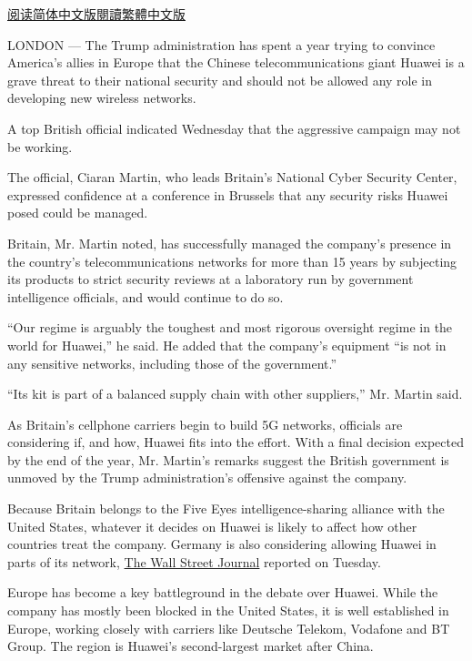 \href{https://cn.nytimes.com/business/20190221/huawei-uk-trump/}{阅读简体中文版}\href{https://cn.nytimes.com/business/20190221/huawei-uk-trump/zh-hant/}{閱讀繁體中文版}

LONDON --- The Trump administration has spent a year trying to convince
America's allies in Europe that the Chinese telecommunications giant
Huawei is a grave threat to their national security and should not be
allowed any role in developing new wireless networks.

A top British official indicated Wednesday that the aggressive campaign
may not be working.

The official, Ciaran Martin, who leads Britain's National Cyber Security
Center, expressed confidence at a conference in Brussels that any
security risks Huawei posed could be managed.

Britain, Mr. Martin noted, has successfully managed the company's
presence in the country's telecommunications networks for more than 15
years by subjecting its products to strict security reviews at a
laboratory run by government intelligence officials, and would continue
to do so.

``Our regime is arguably the toughest and most rigorous oversight regime
in the world for Huawei,'' he said. He added that the company's
equipment ``is not in any sensitive networks, including those of the
government.''

``Its kit is part of a balanced supply chain with other suppliers,'' Mr.
Martin said.

As Britain's cellphone carriers begin to build 5G networks, officials
are considering if, and how, Huawei fits into the effort. With a final
decision expected by the end of the year, Mr. Martin's remarks suggest
the British government is unmoved by the Trump administration's
offensive against the company.

Because Britain belongs to the Five Eyes intelligence-sharing alliance
with the United States, whatever it decides on Huawei is likely to
affect how other countries treat the company. Germany is also
considering allowing Huawei in parts of its network,
\href{https://www.wsj.com/articles/in-rebuke-to-u-s-germany-considers-letting-huawei-in-11550577810}{The
Wall Street Journal} reported on Tuesday.

Europe has become a key battleground in the debate over Huawei. While
the company has mostly been blocked in the United States, it is well
established in Europe, working closely with carriers like Deutsche
Telekom, Vodafone and BT Group. The region is Huawei's second-largest
market after China.

